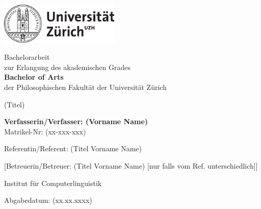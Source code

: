\begin{titlepage}
\includegraphics[height=20mm]{images/uzh_logo_d_pos}\\

\begin{center}

{\sffamily
Bachelorarbeit \\
zur Erlangung des akademischen Grades \\
\textbf{Bachelor of Arts} \\
der Philosophischen Fakultät der Universität Zürich \\

\vspace{2cm}

{\Huge (Titel)}\\

\vspace{4cm}

\textbf{Verfasserin/Verfasser: (Vorname Name)} \\
	Matrikel-Nr: (xx-xxx-xxx) \\

\vspace{2cm}

Referentin/Referent: (Titel Vorname Name)

[Betreuerin/Betreuer: (Titel Vorname Name) {\small [nur falls vom Ref. unterschiedlich]}]

Institut f\"ur Computerlinguistik

\vfill Abgabedatum: (xx.xx.xxxx)

\vspace{3cm}
}
\end{center}

\end{titlepage}

\newpage
